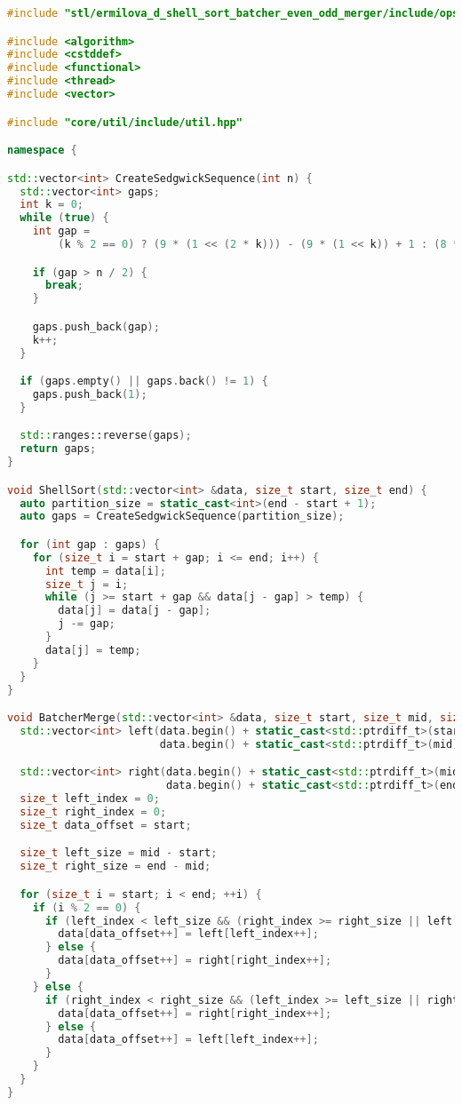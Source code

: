 \documentclass[a4paper,12pt]{article}
\begin{document}
\begin{lstlisting}[language=C++]
#include "stl/ermilova_d_shell_sort_batcher_even_odd_merger/include/ops_stl.hpp"

#include <algorithm>
#include <cstddef>
#include <functional>
#include <thread>
#include <vector>

#include "core/util/include/util.hpp"

namespace {

std::vector<int> CreateSedgwickSequence(int n) {
  std::vector<int> gaps;
  int k = 0;
  while (true) {
    int gap =
        (k % 2 == 0) ? (9 * (1 << (2 * k))) - (9 * (1 << k)) + 1 : (8 * (1 << k)) - (6 * (1 << ((k + 1) / 2))) + 1;

    if (gap > n / 2) {
      break;
    }

    gaps.push_back(gap);
    k++;
  }

  if (gaps.empty() || gaps.back() != 1) {
    gaps.push_back(1);
  }

  std::ranges::reverse(gaps);
  return gaps;
}

void ShellSort(std::vector<int> &data, size_t start, size_t end) {
  auto partition_size = static_cast<int>(end - start + 1);
  auto gaps = CreateSedgwickSequence(partition_size);

  for (int gap : gaps) {
    for (size_t i = start + gap; i <= end; i++) {
      int temp = data[i];
      size_t j = i;
      while (j >= start + gap && data[j - gap] > temp) {
        data[j] = data[j - gap];
        j -= gap;
      }
      data[j] = temp;
    }
  }
}

void BatcherMerge(std::vector<int> &data, size_t start, size_t mid, size_t end) {
  std::vector<int> left(data.begin() + static_cast<std::ptrdiff_t>(start),
                        data.begin() + static_cast<std::ptrdiff_t>(mid));

  std::vector<int> right(data.begin() + static_cast<std::ptrdiff_t>(mid),
                         data.begin() + static_cast<std::ptrdiff_t>(end));
  size_t left_index = 0;
  size_t right_index = 0;
  size_t data_offset = start;

  size_t left_size = mid - start;
  size_t right_size = end - mid;

  for (size_t i = start; i < end; ++i) {
    if (i % 2 == 0) {
      if (left_index < left_size && (right_index >= right_size || left[left_index] <= right[right_index])) {
        data[data_offset++] = left[left_index++];
      } else {
        data[data_offset++] = right[right_index++];
      }
    } else {
      if (right_index < right_size && (left_index >= left_size || right[right_index] <= left[left_index])) {
        data[data_offset++] = right[right_index++];
      } else {
        data[data_offset++] = left[left_index++];
      }
    }
  }
}


\end{lstlisting}
\end{document}
